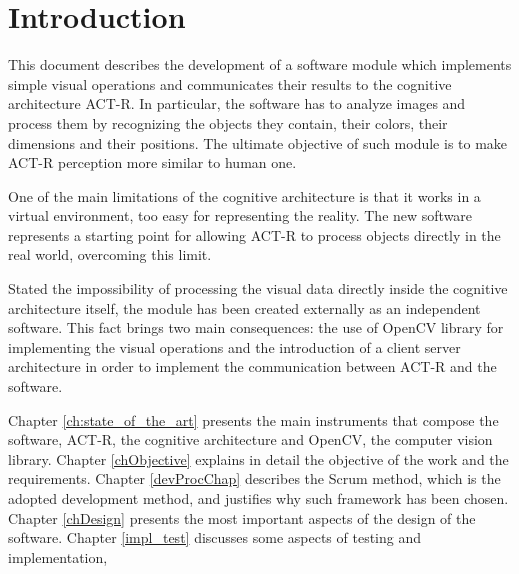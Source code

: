 \chapter{Introduction}
	This document describes the development of a software module which implements simple visual operations and communicates their results to the cognitive architecture \mbox{ACT-R}.
	In particular, the software has to analyze images and process them by recognizing the objects they contain, their colors, their dimensions and their positions.
	The ultimate objective of such module is to make \mbox{ACT-R} perception more similar to human one.
	
	One of the main limitations of the cognitive architecture is that it works in a virtual environment, too easy for representing the reality. 
	The new software represents a starting point for allowing \mbox{ACT-R} to process objects directly in the real world, overcoming this limit.
	
	Stated the impossibility of processing the visual data directly inside the cognitive architecture itself, the module has been created externally as an independent software.
	This fact brings two main consequences: the use of OpenCV library for implementing the visual operations and the introduction of a client server architecture in order to implement the communication between \mbox{ACT-R} and the software.

	Chapter \ref{ch:state_of_the_art} presents the main instruments that compose the software, \mbox{ACT-R}, the cognitive architecture and \mbox{OpenCV}, the computer vision library.
	Chapter \ref{chObjective} explains in detail the objective of the work and the requirements.
	Chapter \ref{devProcChap} describes the Scrum method, which is the adopted development method, and justifies why such framework has been chosen.
	Chapter \ref{chDesign} presents the most important aspects of the design of the software.
	Chapter \ref{impl_test} discusses some aspects of testing and implementation, 


 	
	
